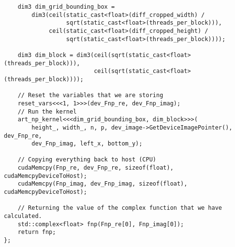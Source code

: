 \begin{lstlisting}
    dim3 dim_grid_bounding_box =
        dim3(ceil(static_cast<float>(diff_cropped_width) /
                  sqrt(static_cast<float>(threads_per_block))),
             ceil(static_cast<float>(diff_cropped_height) /
                  sqrt(static_cast<float>(threads_per_block))));

    dim3 dim_block = dim3(ceil(sqrt(static_cast<float>(threads_per_block))),
                          ceil(sqrt(static_cast<float>(threads_per_block))));

    // Reset the variables that we are storing
    reset_vars<<<1, 1>>>(dev_Fnp_re, dev_Fnp_imag);
    // Run the kernel
    art_np_kernel<<<dim_grid_bounding_box, dim_block>>>(
        height_, width_, n, p, dev_image->GetDeviceImagePointer(), dev_Fnp_re,
        dev_Fnp_imag, left_x, bottom_y);

    // Copying everything back to host (CPU)
    cudaMemcpy(Fnp_re, dev_Fnp_re, sizeof(float), cudaMemcpyDeviceToHost);
    cudaMemcpy(Fnp_imag, dev_Fnp_imag, sizeof(float), cudaMemcpyDeviceToHost);

    // Returning the value of the complex function that we have calculated.
    std::complex<float> fnp(Fnp_re[0], Fnp_imag[0]);
    return fnp;
};


\end{lstlisting}

